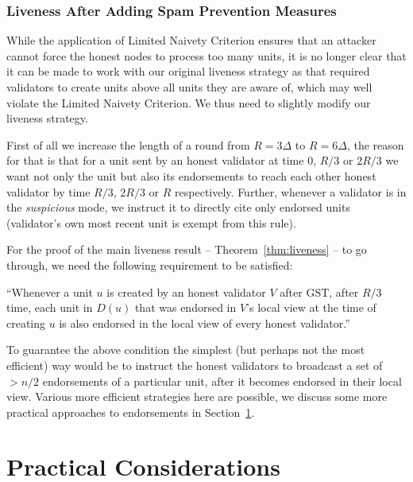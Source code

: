 \documentclass[12pt, fleqn]{article}
\newcommand{\gst}{\mathrm{GST}}
\begin{document}
\subsubsection{Liveness After Adding Spam Prevention Measures}\label{sec:dynamicrounds}

While the application of Limited Naivety Criterion ensures that an attacker cannot force the honest nodes to process too many units, it is no longer clear that it can be made to work with our original liveness strategy as that required validators to create units above all units they are aware of, which may well violate the Limited Naivety Criterion. We thus need to slightly modify our liveness strategy.

First of all we increase the length of a round from $R=3\Delta$ to $R=6\Delta$, the reason for that is that for a unit sent by an honest validator at time $0$, $R/3$ or $2R/3$ we want not only the unit but also its endorsements to reach each other honest validator by time $R/3$, $2R/3$ or $R$ respectively.
%
Further, whenever a validator is in the {\it suspicious} mode, we instruct it to directly cite only endorsed units (validator's own most recent unit is exempt from this rule).

For the proof of the main liveness result -- Theorem~\ref{thm:liveness} -- to go through, we need the following requirement to be satisfied: 

 ``Whenever a unit $u$ is created by an honest validator $V$ after $\gst$, after $R/3$ time, each unit in $D(u)$ that was endorsed in $V$'s local view at the time of creating $u$ is also endorsed in the local view of every honest validator.''

To guarantee the above condition the simplest (but perhaps not the most efficient) way would be to instruct the honest validators to broadcast a set of $>n/2$ endorsements of a particular unit, after it becomes endorsed in their local view.
%
Various more efficient strategies here are possible, we discuss some more practical approaches to endorsements in Section~\ref{sec:practical}.


\section{Practical Considerations}\label{sec:practical}
\end{document}
